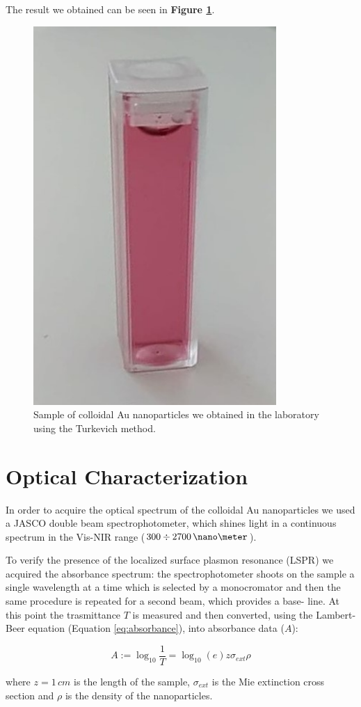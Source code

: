 \documentclass[twocolumn]{article}
\begin{document}
\begin{multicols}{2}
The result we obtained can be seen in \textbf{Figure \ref{fig:sample}}.

\begin{figure}[H]
    \centering
    \includegraphics[width=0.45\linewidth]{image/data/turkevich.pdf}
    \caption{Sample of colloidal Au nanoparticles we obtained in the laboratory using the Turkevich method.}
    \label{fig:sample}
\end{figure}

\section{Optical Characterization}
\label{sec:optic_char}
\noindent
In order to acquire the optical spectrum of the colloidal Au nanoparticles we used a JASCO double beam spectrophotometer, which shines light in a continuous spectrum in the Vis-NIR range ($300\div 2700\, \nano\meter $).

To verify the presence of the localized surface plasmon resonance (LSPR) we acquired the absorbance spectrum: the spectrophotometer shoots on the sample a single wavelength at a time which is selected by a monocromator and then the same procedure is repeated for a second beam, which provides a base-
line. At this point the trasmittance $T$ is measured and then converted, using the Lambert-Beer equation (Equation \ref{eq:absorbance}), into absorbance data ($A$): 

\begin{equation}
    A:=\log_{10}\frac{1}{T}=\log_{10}(e)z \sigma_{ext} \rho
    \label{eq:absorbance}
\end{equation}

\noindent
where $z=1\, cm$ is the length of the sample, $\sigma_{ext}$ is the Mie extinction cross section and $\rho$ is the density of the nanoparticles.


\end{multicols}
\end{document}
